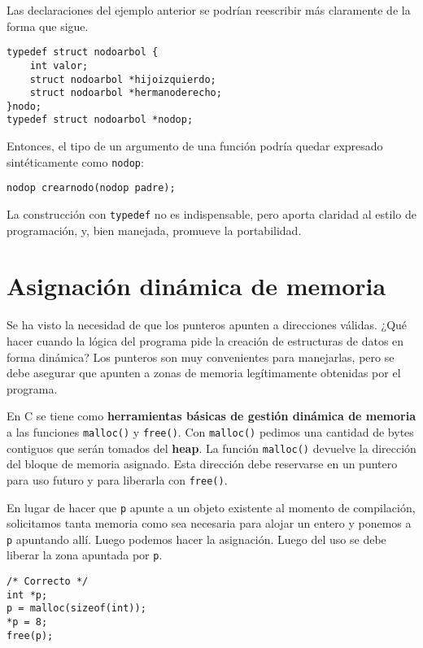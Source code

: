 \begin{ejemplo}
Las declaraciones del ejemplo anterior se podrían reescribir más claramente de
la forma que sigue.
\begin{lstlisting}
typedef struct nodoarbol {
    int valor;
    struct nodoarbol *hijoizquierdo;
    struct nodoarbol *hermanoderecho;
}nodo;
typedef struct nodoarbol *nodop;	
\end{lstlisting}

Entonces, el tipo de un argumento de una función podría quedar expresado
sintéticamente como \lstinline{nodop}:
\begin{lstlisting}
nodop crearnodo(nodop padre);
\end{lstlisting}

La construcción con \lstinline{typedef} no es indispensable, pero aporta claridad al estilo
de programación, y, bien manejada, promueve la portabilidad.
\end{ejemplo}


\section{Asignación dinámica de memoria}
Se ha visto la necesidad de que los punteros apunten a direcciones válidas.
¿Qué hacer cuando la lógica del programa pide la creación de estructuras de
datos en forma dinámica? Los punteros son muy convenientes para manejarlas,
pero se debe asegurar que apunten a zonas de memoria legítimamente obtenidas
por el programa.

En C se tiene como \textbf{herramientas básicas de gestión dinámica de memoria} a las
funciones \lstinline{malloc()} y \lstinline{free()}. Con \lstinline{malloc()} pedimos una cantidad de bytes
contiguos que serán tomados del \textbf{heap}. La función \lstinline{malloc()} devuelve la dirección
del bloque de memoria asignado. Esta dirección debe reservarse en un puntero
para uso futuro y para liberarla con \lstinline{free()}.

\begin{ejemplo}
En lugar de hacer que \lstinline{p} apunte a un objeto existente al momento de compilación,
solicitamos tanta memoria como sea necesaria para alojar un entero y ponemos a
\lstinline{p} apuntando allí. Luego podemos hacer la asignación. Luego del uso se debe
liberar la zona apuntada por \lstinline{p}.

\begin{lstlisting}
/* Correcto */
int *p;
p = malloc(sizeof(int));
*p = 8;
free(p);
\end{lstlisting}
\end{ejemplo}

